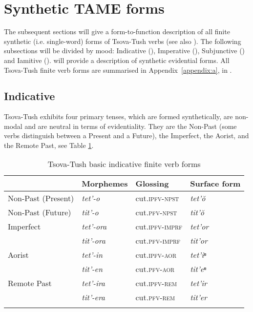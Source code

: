 \pagebreak

\section{Synthetic TAME forms} \label{TAME}
The subsequent sections will give a form-to-function description of all finite synthetic (i.e. single-word) forms of Tsova-Tush verbs (see also \cites{chrelashvili84}[179--182]{holiskygagua}). The following subsections will be divided by mood: Indicative (), Imperative (), Subjunctive () and Iamitive ().  will provide a description of synthetic evidential forms. All Tsova-Tush finite verb forms are summarised in Appendix~\ref{appendix:a}, in .


\subsection{Indicative} \label{ind}
Tsova-Tush exhibits four primary tenses, which are formed synthetically, are non-modal and are neutral in terms of evidentiality. They are the Non-Past (some verbs distinguish between a Present and a Future), the Imperfect, the Aorist, and the Remote Past, see Table \ref{table-indverbflex}.

\begin{table}
	\begin{tabular}{llll}
		\lsptoprule
		
		& {Morphemes} & {Glossing} & {Surface form} \\
		\midrule
		
		Non-Past (Present) & \textit{tet'-o} & cut.\textsc{ipfv-npst} & \textit{tet'\u{o}} \\
		Non-Past (Future) & \textit{tit'-o} & cut.\textsc{pfv-npst} & \textit{tit'\u{o}} \\
		
		Imperfect & \textit{tet'-ora} & cut.\textsc{ipfv-imprf} & \textit{tet'or} \\
		& \textit{tit'-ora} & cut.\textsc{pfv-imprf} & \textit{tit'or} \\
		
		Aorist  & \textit{tet'-in} & cut.\textsc{ipfv-aor} & \textit{tet'iⁿ} \\
		& \textit{tit'-en} & cut.\textsc{pfv-aor} & \textit{tit'eⁿ} \\
		
		Remote Past  & \textit{tet'-ira} & cut.\textsc{ipfv-rem} & \textit{tet'ir} \\
		& \textit{tit'-era} & cut.\textsc{pfv-rem} & \textit{tit'er} \\
		\lspbottomrule
	\end{tabular}
	\caption{Tsova-Tush basic indicative finite verb forms}
	\label{table-indverbflex}
\end{table}



